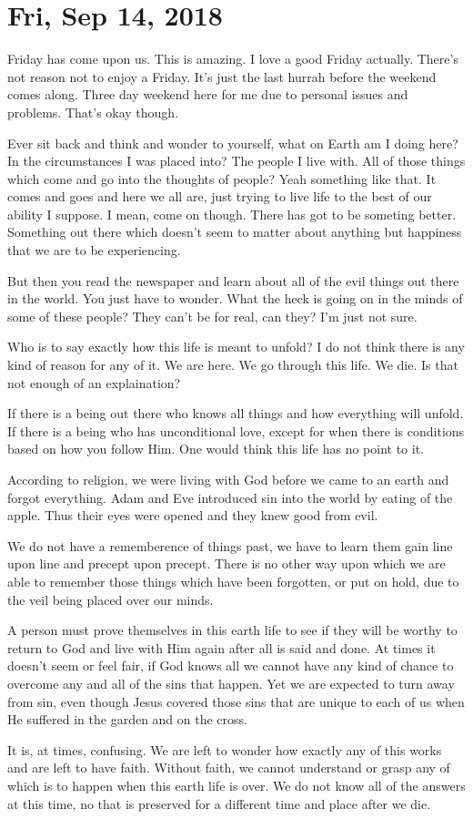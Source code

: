 \section{Fri, Sep 14, 2018}

Friday has come upon us. This is amazing. I love a good Friday actually. There's not
reason not to enjoy a Friday. It's just the last hurrah before the weekend comes
along. Three day weekend here for me due to personal issues and problems. That's okay
though.

Ever sit back and think and wonder to yourself, what on Earth am I doing here? In the
circumstances I was placed into? The people I live with. All of those things which
come and go into the thoughts of people? Yeah something like that. It comes and goes
and here we all are, just trying to live life to the best of our ability I suppose. I
mean, come on though. There has got to be someting better. Something out there which
doesn't seem to matter about anything but happiness that we are to be experiencing.

But then you read the newspaper and learn about all of the evil things out there in
the world. You just have to wonder. What the heck is going on in the minds of some of
these people? They can't be for real, can they? I'm just not sure.

Who is to say exactly how this life is meant to unfold? I do not think there is any
kind of reason for any of it. We are here. We go through this life. We die. Is that
not enough of an explaination?

If there is a being out there who knows all things and how everything will unfold. If
there is a being who has unconditional love, except for when there is conditions
based on how you follow Him. One would think this life has no point to it.

According to religion, we were living with God before we came to an earth and forgot
everything. Adam and Eve introduced sin into the world by eating of the apple. Thus
their eyes were opened and they knew good from evil.

We do not have a rememberence of things past, we have to learn them gain line upon
line and precept upon precept. There is no other way upon which we are able to
remember those things which have been forgotten, or put on hold, due to the veil
being placed over our minds.

A person must prove themselves in this earth life to see if they will be worthy to
return to God and live with Him again after all is said and done. At times it doesn't
seem or feel fair, if God knows all we cannot have any kind of chance to overcome any
and all of the sins that happen. Yet we are expected to turn away from sin, even
though Jesus covered those sins that are unique to each of us when He suffered in the
garden and on the cross.

It is, at times, confusing. We are left to wonder how exactly any of this works and
are left to have faith. Without faith, we cannot understand or grasp any of which is
to happen when this earth life is over. We do not know all of the answers at this
time, no that is preserved for a different time and place after we die.